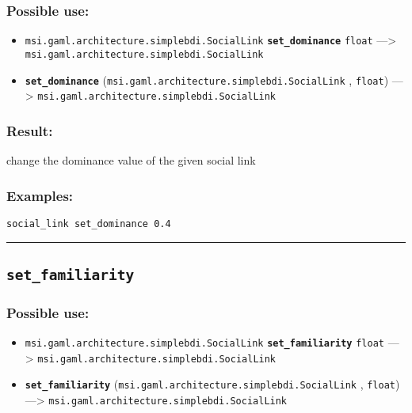 \documentclass[]{book}
\providecommand{\tightlist}{%
  \setlength{\itemsep}{0pt}\setlength{\parskip}{0pt}}
\theoremstyle{definition}
\theoremstyle{definition}
\theoremstyle{definition}
\theoremstyle{remark}
\begin{document}
\subsubsection{Possible use:}\label{possible-use-458}

\begin{itemize}
\tightlist
\item
  \texttt{msi.gaml.architecture.simplebdi.SocialLink}
  \textbf{\texttt{set\_dominance}} \texttt{float} ---\textgreater{}
  \texttt{msi.gaml.architecture.simplebdi.SocialLink}
\item
  \textbf{\texttt{set\_dominance}}
  (\texttt{msi.gaml.architecture.simplebdi.SocialLink} , \texttt{float})
  ---\textgreater{} \texttt{msi.gaml.architecture.simplebdi.SocialLink}
\end{itemize}

\subsubsection{Result:}\label{result-442}

change the dominance value of the given social link

\subsubsection{Examples:}\label{examples-315}

\begin{verbatim}
social_link set_dominance 0.4 
\end{verbatim}

\begin{center}\rule{0.5\linewidth}{\linethickness}\end{center}

\subsection{\texorpdfstring{\texttt{set\_familiarity}}{set\_familiarity}}\label{set_familiarity}

\subsubsection{Possible use:}\label{possible-use-459}

\begin{itemize}
\tightlist
\item
  \texttt{msi.gaml.architecture.simplebdi.SocialLink}
  \textbf{\texttt{set\_familiarity}} \texttt{float} ---\textgreater{}
  \texttt{msi.gaml.architecture.simplebdi.SocialLink}
\item
  \textbf{\texttt{set\_familiarity}}
  (\texttt{msi.gaml.architecture.simplebdi.SocialLink} , \texttt{float})
  ---\textgreater{} \texttt{msi.gaml.architecture.simplebdi.SocialLink}
\end{itemize}
\end{document}
